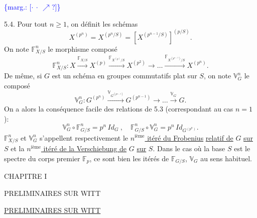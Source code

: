 \documentclass[11pt]{article}
\newcommand{\scanpage}[1]{\par\bigskip\noindent{\small\sffamily[scan #1]}\par}
\newcommand{\mspage}[1]{{\small\sffamily[p.\,#1]}}
\newcommand{\hand}[1]{\textcolor{blue}{#1}}
\newcommand{\margin}[1]{\textcolor{blue}{\{\textsf{marg.:} #1\}}}
\newcommand{\uline}[1]{\underline{#1}}
\newcommand{\unsure}[1]{[#1?]}
\begin{document}
\mspage{12}

\clearpage
\scanpage{129/13}
\margin{\unsure{$\cdot\ \cdot\ \nearrow$}}

5.4. \quad Pour tout $n \geq 1$, on définit les schémas
\[ X^{(p^n)} = X^{(p^n/S)} = [X^{(p^{n-1}/S)}]^{(p/S)} . \]
On note $\mathbb{F}^n_{X/S}$ le morphisme composé
\[ \mathbb{F}^n_{X/S} : X \xrightarrow{\mathbb{F}_{X/S}} X^{(p)} \xrightarrow{\mathbb{F}_{X^{(p)}/S}} X^{(p^2)} \to \dots \xrightarrow{\mathbb{F}_{X^{(p^{n-1})}/S}} X^{(p^n)} . \]
De même, si $G$ est un schéma en groupes commutatifs plat sur $S$, on
note $\mathbb{V}^n_G$ le composé
\[ \mathbb{V}^n_G : G^{(p^n)} \xrightarrow{\mathbb{V}_{G^{(p^{n-1})}}} G^{(p^{n-1})} \to \dots \xrightarrow{\mathbb{V}_G} G . \]
On a alors la conséquence facile des relations de 5.3 (correspondant
au cas $n = 1$):
\[ \mathbb{V}^n_G \circ \mathbb{F}^n_{G/S} = p^n \, Id_G \ , \quad \mathbb{F}^n_{G/S} \circ \mathbb{V}^n_G = p^n \, Id_{G^{(p^n)}} . \]
$\mathbb{F}^n_{X/S}$ et $\mathbb{V}^n_G$ s'appellent respectivement le \uline{$n^{\text{ième}}$ itéré du Frobenius}
\uline{relatif de} $G$ \uline{sur} $S$ et la \uline{$n^{\text{ième}}$ itéré de la Verschiebung de} $G$ \uline{sur} $S$.
Dans le cas où la base $S$ est le spectre du corps premier $\mathbb{F}_p$, ce sont
bien les itérés de $\mathbb{F}_{G/S}$, $\mathbb{V}_G$ au sens habituel.

\mspage{\hand{13}}

\clearpage
\scanpage{129/15}
CHAPITRE I

PRELIMINAIRES SUR WITT

\mspage{\hand{15}}

\clearpage
\scanpage{129/16}
\uline{PRELIMINAIRES SUR WITT}
\end{document}
